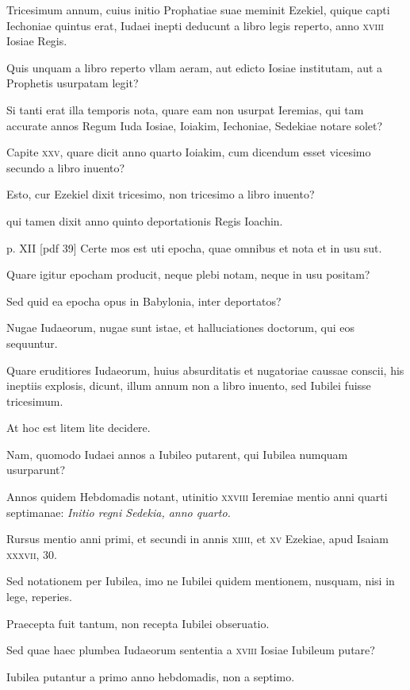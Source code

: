 \begin{parnumbers}
Tricesimum annum, cuius initio Prophatiae suae
meminit Ezekiel, quique capti Iechoniae quintus erat, Iudaei inepti
deducunt a libro legis reperto, anno \textsc{xviii} Iosiae Regis.

Quis unquam a libro reperto vllam aeram, aut edicto Iosiae institutam, aut a
Prophetis usurpatam legit?

Si tanti erat illa temporis nota, quare
eam non usurpat Ieremias, qui tam accurate annos Regum Iuda Iosiae,
Ioiakim, Iechoniae, Sedekiae notare solet?

Capite \textsc{xxv}, quare dicit
anno quarto Ioiakim, cum dicendum esset vicesimo secundo a libro
inuento?

Esto, cur Ezekiel dixit tricesimo, non tricesimo a libro inuento?

qui tamen dixit anno quinto deportationis Regis Ioachin.

\clearpage
p. XII [pdf 39]
Certe mos est uti epocha, quae omnibus et nota et in usu sut.

Quare
igitur epocham producit, neque plebi notam, neque in usu positam?

Sed quid ea epocha opus in Babylonia, inter deportatos?

Nugae Iudaeorum,
nugae sunt istae, et halluciationes doctorum, qui eos sequuntur.

Quare eruditiores Iudaeorum, huius absurditatis et nugatoriae
caussae conscii, his ineptiis explosis, dicunt, illum annum non a
libro inuento, sed Iubilei fuisse tricesimum.

At hoc est litem lite decidere.

Nam, quomodo Iudaei annos a Iubileo putarent, qui Iubilea
numquam usurparunt?

Annos quidem Hebdomadis notant, utinitio
\textsc{xxviii} Ieremiae mentio anni quarti septimanae: \textit{Initio regni
Sedekia, anno quarto.}

Rursus mentio anni primi, et secundi in annis
\textsc{xiiii}, et \textsc{xv} Ezekiae, apud Isaiam \textsc{xxxvii}, 30.

Sed notationem
per Iubilea, imo ne Iubilei quidem mentionem, nusquam, nisi
in lege, reperies.

Praecepta fuit tantum, non recepta Iubilei obseruatio.

Sed quae haec plumbea Iudaeorum sententia a \textsc{xviii} Iosiae
Iubileum putare?

Iubilea putantur a primo anno hebdomadis, non
a septimo.


\end{parnumbers}
